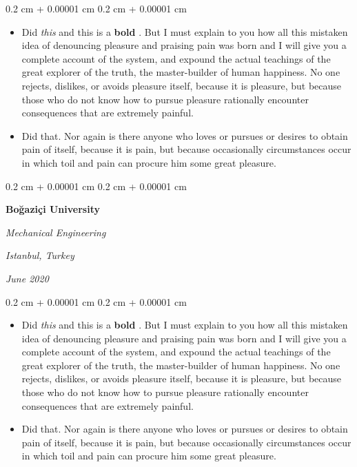 \documentclass[10pt, letterpaper]{article}
\newenvironment{highlights}{
    \begin{itemize}[
        topsep=0.10 cm,
        parsep=0.10 cm,
        partopsep=0pt,
        itemsep=0pt,
        leftmargin=0.4 cm + 10pt
    ]
}{
    \end{itemize}
} %
\newenvironment{onecolentry}{
    \begin{adjustwidth}{
        0.2 cm + 0.00001 cm
    }{
        0.2 cm + 0.00001 cm
    }
}{
    \end{adjustwidth}
} %
\newenvironment{twocolentry}[2][]{
    \onecolentry
    \def\secondColumn{#2}
    \setcolumnwidth{\fill, 4.5 cm}
    \begin{paracol}{2}
}{
    \switchcolumn \raggedleft \secondColumn
    \end{paracol}
    \endonecolentry
} %
\let\hrefWithoutArrow\href
\renewcommand{\href}[2]{\hrefWithoutArrow{#1}{\mbox{\ifthenelse{\equal{#2}{}}{ }{#2 }\raisebox{.15ex}{\footnotesize \faExternalLink*}}}}
\begin{document}
        \vspace{0.10 cm-3px}
        \begin{onecolentry}
            \begin{highlights}
                \item Did \textit{this} and this is a \textbf{bold} \href{https://example.com}{link}. But I must explain to you how all this mistaken idea of denouncing pleasure and praising pain was born and I will give you a complete account of the system, and expound the actual teachings of the great explorer of the truth, the master-builder of human happiness. No one rejects, dislikes, or avoids pleasure itself, because it is pleasure, but because those who do not know how to pursue pleasure rationally encounter consequences that are extremely painful.
                \item Did that. Nor again is there anyone who loves or pursues or desires to obtain pain of itself, because it is pain, but because occasionally circumstances occur in which toil and pain can procure him some great pleasure.
            \end{highlights}
        \end{onecolentry}


        \vspace{0.2 cm-3px}

        \begin{twocolentry}{
        \textit{Istanbul, Turkey}    
            
        \textit{June 2020}}
            \textbf{Boğaziçi University}

            \textit{Mechanical Engineering}
        \end{twocolentry}

        \vspace{0.10 cm-3px}
        \begin{onecolentry}
            \begin{highlights}
                \item Did \textit{this} and this is a \textbf{bold} \href{https://example.com}{link}. But I must explain to you how all this mistaken idea of denouncing pleasure and praising pain was born and I will give you a complete account of the system, and expound the actual teachings of the great explorer of the truth, the master-builder of human happiness. No one rejects, dislikes, or avoids pleasure itself, because it is pleasure, but because those who do not know how to pursue pleasure rationally encounter consequences that are extremely painful.
                \item Did that. Nor again is there anyone who loves or pursues or desires to obtain pain of itself, because it is pain, but because occasionally circumstances occur in which toil and pain can procure him some great pleasure.
            \end{highlights}
        \end{onecolentry}
\end{document}
